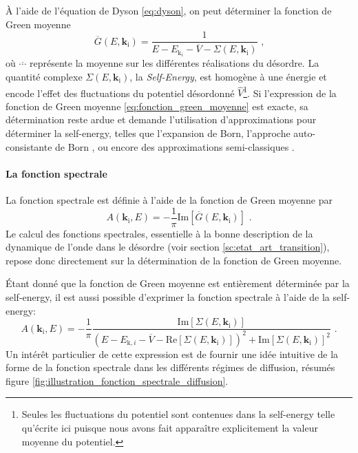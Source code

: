 À l'aide de l'équation de Dyson \ref{eq:dyson}, on peut déterminer la fonction de Green moyenne 
\begin{equation}
\overline{G}(E,\mathbf{k}_{\mathrm{i}})=\frac{1}{E-E_{\mathrm{k}_i}-\overline{V}-\Sigma(E,\mathbf{k}_{\mathrm{i}})} \text{ ,}
\label{eq:fonction_green_moyenne}
\end{equation}
où $\overline{\cdots}$ représente la moyenne sur les différentes réalisations du désordre. La quantité complexe $\Sigma(E,\mathbf{k}_{\mathrm{i}})$, la \emph{Self-Energy}, est homogène à une énergie et encode l'effet des fluctuations du potentiel désordonné $\hat{V}$\footnote{Seules les fluctuations du potentiel sont contenues dans la self-energy telle qu'écrite ici puisque nous avons fait apparaître explicitement la valeur moyenne du potentiel.}. Si l'expression de la fonction de Green moyenne \ref{eq:fonction_green_moyenne} est exacte, sa détermination reste ardue et demande l'utilisation d'approximations pour déterminer la self-energy, telles que l'expansion de Born\citep{kuhn2007coherent}\citep{lugan2009one}, l'approche auto-consistante de Born \citep{skipetrov2008anderson}\citep{yedjour2010diffusion}, ou encore des approximations semi-classiques \citep{trappe2015semiclassical}\citep{prat2016semiclassical}. 


\paragraph*{La fonction spectrale}
La fonction spectrale est définie à l'aide de la fonction de Green moyenne par
\begin{equation}
A(\mathbf{k}_{\mathrm{i}},E)= -\frac{1}{\pi} \mathrm{Im}[\overline{G}(E,\mathbf{k}_{\mathrm{i}})] \text{ .}
\end{equation}
Le calcul des fonctions spectrales, essentielle à la bonne description de la dynamique de l'onde dans le désordre (voir section \ref{sc:etat_art_transition}), repose donc directement sur la détermination de la fonction de Green moyenne.

Étant donné que la fonction de Green moyenne est entièrement déterminée par la self-energy, il est aussi possible d'exprimer la fonction spectrale à l'aide de la self-energy:
\begin{equation}
A(\mathbf{k}_{\mathrm{i}},E)=-\frac{1}{\pi}\frac{\mathrm{Im}[\Sigma(E,\mathbf{k}_{\mathrm{i}})]}{(E-E_{\mathrm{k},i}-\overline{V}-\mathrm{Re}[\Sigma(E,\mathbf{k}_{\mathrm{i}})])^2+\mathrm{Im}[\Sigma(E,\mathbf{k}_{\mathrm{i}})]^2} \text{ .}
\end{equation}
Un intérêt particulier de cette expression est de fournir une idée intuitive de la forme de la fonction spectrale dans les différents régimes de diffusion, résumés figure \ref{fig:illustration_fonction_spectrale_diffusion}. 

